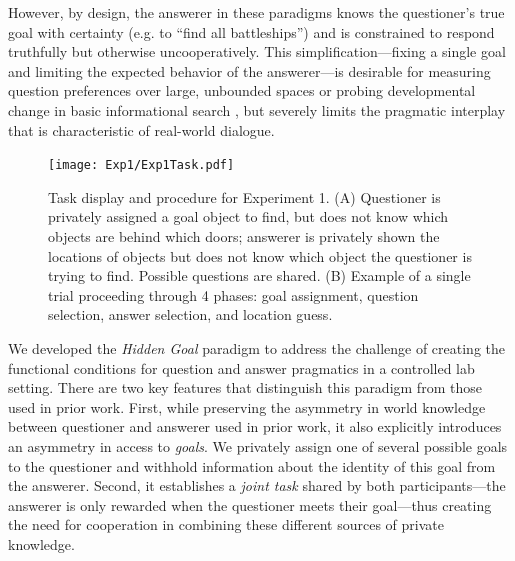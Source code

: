 \documentclass[11pt, floatsintext]{apa6}
\begin{document}
However, by design, the answerer in these paradigms knows the questioner's true goal with certainty (e.g. to ``find all battleships'') and is constrained to respond truthfully but otherwise uncooperatively.
This simplification---fixing a single goal and limiting the expected behavior of the answerer---is desirable for measuring question preferences over large, unbounded spaces \cite{cohen2016searching, rothe2017question} or probing developmental change in basic informational search \cite{RuggeriEtAl15_HierarchicalTwentyQs, ruggeri2016sources}, but severely limits the pragmatic interplay that is characteristic of real-world dialogue. 

\begin{figure}[t!]
\begin{center}
\texttt{[image: Exp1/Exp1Task.pdf]}
\end{center}
\caption{\footnotesize Task display and procedure for Experiment 1. (A) Questioner is privately assigned a goal object to find, but does not know which objects are behind which doors; answerer is privately shown the locations of objects but does not know which object the questioner is trying to find. Possible questions are shared. (B) Example of a single trial proceeding through 4 phases: goal assignment, question selection, answer selection, and location guess.}
\label{fig:expviews}
\end{figure}


We developed the \emph{Hidden Goal} paradigm to address the challenge of creating the functional conditions for question and answer pragmatics in a controlled lab setting.
There are two key features that distinguish this paradigm from those used in prior work.
First, while preserving the asymmetry in world knowledge between questioner and answerer used in prior work, it also explicitly introduces an asymmetry in access to \emph{goals}.
We privately assign one of several possible goals to the questioner and withhold information about the identity of this goal from the answerer. 
Second, it establishes a \emph{joint task} shared by both participants---the answerer is only rewarded when the questioner meets their goal---thus creating the need for cooperation in combining these different sources of private knowledge. 

\end{document}
